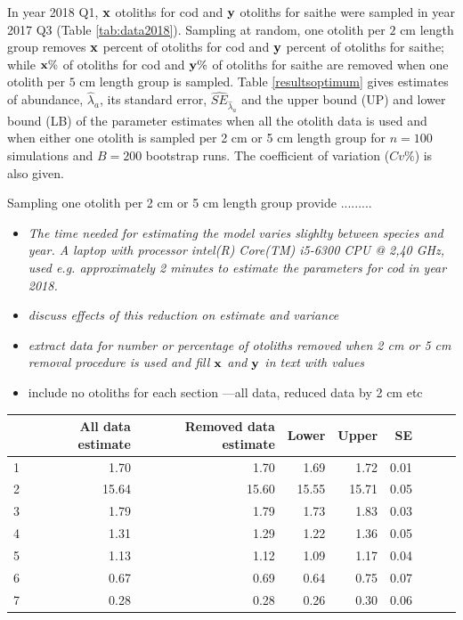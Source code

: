 \documentclass[a4paper 12pt]{article}
\numberwithin{equation}{section}
\begin{document}
In year 2018 Q1, ${\bf x}$ otoliths for cod and ${\bf y}$ otoliths for saithe were sampled in year 2017 Q3 (Table \ref{tab:data2018}). Sampling at random, one otolith per $2$ cm length group removes ${\bf x}$ percent of otoliths for cod and ${\bf y}$ percent of otoliths for saithe; while ${\bf x \%}$ of otoliths  for cod and ${\bf y \%}$  of otoliths for saithe are removed when one otolith per $5$ cm length group is sampled. Table \ref{resultsoptimum} gives estimates of abundance, $\hat{\lambda}_{a}$, its standard error, $\widehat{SE}_{\hat{\lambda}_{a}}$ and the upper bound (UP) and lower bound (LB) of the parameter estimates when all the otolith data is used and when either one otolith is sampled per 2 cm or 5 cm length group for  $n = 100$ simulations and $B = 200$ bootstrap runs. The coefficient of variation ($Cv \%$) is also given.

Sampling one otolith per 2 cm or 5 cm length group provide .........

\begin{itemize}
\item \emph{The time needed for estimating the model varies slighlty between species and year. A laptop with  processor intel(R) Core(TM) i5-6300 CPU @ 2,40 GHz, used e.g. approximately 2 minutes to estimate the parameters for cod in year 2018.}
\item \emph{discuss effects of this reduction on estimate and variance}
\item \emph{extract data for number or percentage of otoliths removed when 2 cm or 5 cm removal procedure is used and fill ${\bf x}$  and ${\bf y}$ in text with values }
\item include no otoliths for each section ---all data, reduced data by 2 cm etc
\end{itemize}


\clearpage

\begin{table}[ht]
\centering
{}
\begin{tabular}{rrrrrrrrr}
  \hline
 & All data estimate & Removed data estimate & Lower & Upper  & SE  \\ 
  \hline
1 & 1.70 & 1.70      &  1.69 & 1.72 & 0.01 \\ 
  2 & 15.64 & 15.60  & 15.55 & 15.71 & 0.05 \\ 
  3 & 1.79 & 1.79    & 1.73 & 1.83 & 0.03  \\ 
  4 & 1.31 & 1.29    & 1.22 & 1.36 & 0.05  \\ 
  5 & 1.13 & 1.12    & 1.09 & 1.17 & 0.04  \\ 
  6 & 0.67 & 0.69    & 0.64 & 0.75 & 0.07  \\ 
  7 & 0.28 & 0.28    & 0.26 & 0.30 & 0.06  \\ 
   \hline
\end{tabular}
\end{table}
\end{document}
